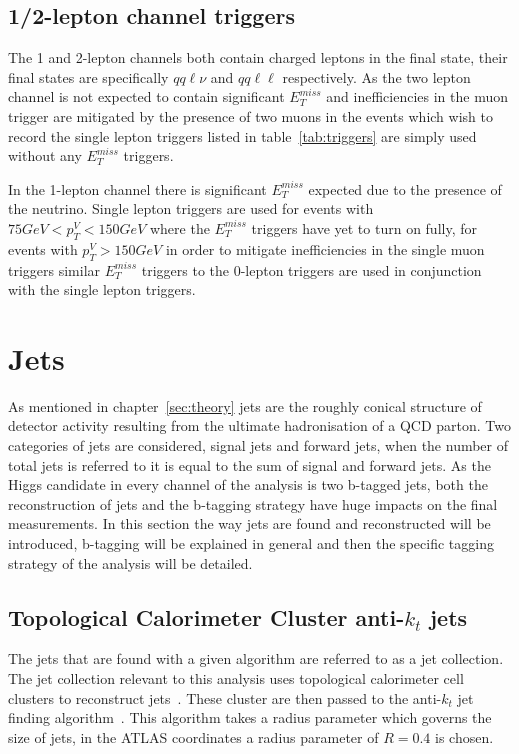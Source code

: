 \subsection{1/2-lepton channel triggers}
The 1 and 2-lepton channels both contain charged leptons in the final state,
their final states are specifically $qq\ell\nu$ and $qq\ell\ell$ respectively.
As the two lepton channel is not expected to contain significant $E_T^{miss}$
and inefficiencies in the muon trigger are mitigated by the presence of two
muons in the events which wish to record the single lepton triggers listed in
table~\ref{tab:triggers} are simply used without any $E_T^{miss}$ triggers.

In the 1-lepton channel there is significant $E_T^{miss}$ expected due to the
presence of the neutrino. Single lepton triggers are used for events with $75
GeV < p_T^{V} < 150 GeV$ where the $E_T^{miss}$ triggers have yet to turn on
fully, for events with $p_T^{V} > 150 GeV$ in order to mitigate inefficiencies
in the single muon triggers similar $E_T^{miss}$ triggers to the 0-lepton
triggers are used in conjunction with the single lepton triggers.


\section{Jets}
\label{sec:jets}

As mentioned in chapter~\ref{sec:theory} jets are the roughly conical structure
of detector activity resulting from the ultimate hadronisation of a QCD parton.
Two categories of jets are considered, signal jets and forward jets, when the
number of total jets is referred to it is equal to the sum of signal and forward
jets. As the Higgs candidate in every channel of the analysis is two b-tagged
jets, both the reconstruction of jets and the b-tagging strategy have huge
impacts on the final measurements. In this section the way jets are found and
reconstructed will be introduced, b-tagging will be explained in general and
then the specific tagging strategy of the analysis will be detailed.

\subsection{Topological Calorimeter Cluster anti-$k_t$ jets}
The jets that are found with a given algorithm are referred to as a jet
collection. The jet collection relevant to this analysis uses topological
calorimeter cell clusters to reconstruct jets~\cite{emtopo}. These cluster are
then passed to the anti-$k_t$ jet finding algorithm~\cite{anti-kt}. This
algorithm takes a radius parameter which governs the size of jets, in the ATLAS
coordinates a radius parameter of $R=0.4$ is chosen.

